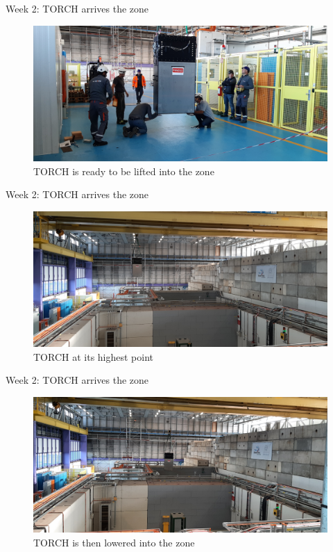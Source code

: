 \documentclass{beamer}
\begin{document}
\begin{frame}{Week 2: TORCH arrives the zone}
  \begin{figure}
    \centering
    \includegraphics[width = 1.0\textwidth]{Plots/TORCH_transport_2.jpg}
    \caption{TORCH is ready to be lifted into the zone}
  \end{figure}
\end{frame}

\begin{frame}{Week 2: TORCH arrives the zone}
  \begin{figure}
    \centering
    \includegraphics[width = 1.0\textwidth]{Plots/TORCH_transport_4.jpg}
    \caption{TORCH at its highest point}
  \end{figure}
\end{frame}

\begin{frame}{Week 2: TORCH arrives the zone}
  \begin{figure}
    \centering
    \includegraphics[width = 1.0\textwidth]{Plots/TORCH_transport_5.jpg}
    \caption{TORCH is then lowered into the zone}
  \end{figure}
\end{frame}
\end{document}
